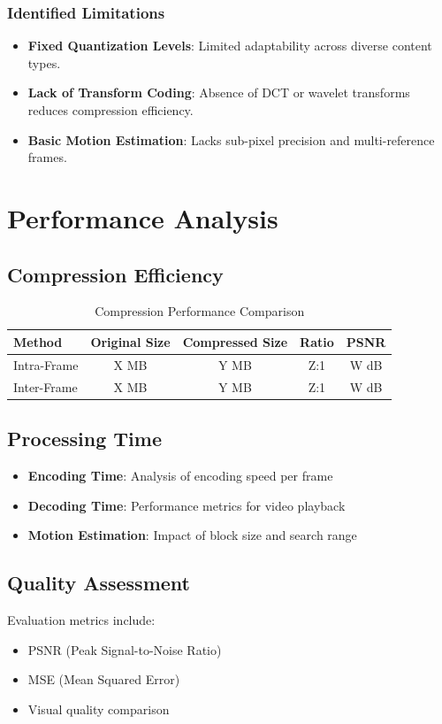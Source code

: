 \documentclass[a4paper,14pt]{article}
\begin{document}
\subsubsection{Identified Limitations}
\begin{itemize}
\item \textbf{Fixed Quantization Levels}: Limited adaptability across diverse content types.
\item \textbf{Lack of Transform Coding}: Absence of DCT or wavelet transforms reduces compression efficiency.
\item \textbf{Basic Motion Estimation}: Lacks sub-pixel precision and multi-reference frames.
\end{itemize}

\section{Performance Analysis}

\subsection{Compression Efficiency}
\begin{table}[h]
\centering
\begin{tabular}{|l|c|c|c|c|}
\hline
\textbf{Method} & \textbf{Original Size} & \textbf{Compressed Size} & \textbf{Ratio} & \textbf{PSNR} \\
\hline
Intra-Frame & X MB & Y MB & Z:1 & W dB \\
Inter-Frame & X MB & Y MB & Z:1 & W dB \\
\hline
\end{tabular}
\caption{Compression Performance Comparison}
\end{table}

\subsection{Processing Time}
\begin{itemize}
    \item \textbf{Encoding Time}: Analysis of encoding speed per frame
    \item \textbf{Decoding Time}: Performance metrics for video playback
    \item \textbf{Motion Estimation}: Impact of block size and search range
\end{itemize}

\subsection{Quality Assessment}
Evaluation metrics include:
\begin{itemize}
    \item PSNR (Peak Signal-to-Noise Ratio)
    \item MSE (Mean Squared Error)
    \item Visual quality comparison
\end{itemize}
\end{document}
